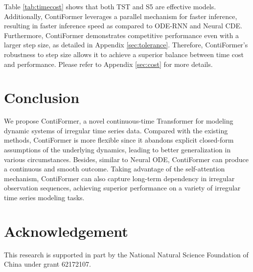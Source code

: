 \documentclass{article}
\begin{document}
Table \ref{tab:timecost} shows that both TST and S5 are effective models. Additionally, ContiFormer leverages a parallel mechanism for faster inference, resulting in faster inference speed as compared to ODE-RNN and Neural CDE. Furthermore, ContiFormer demonstrates competitive performance even with a larger step size, as detailed in Appendix \ref{sec:tolerance}. Therefore, ContiFormer's robustness to step size allows it to achieve a superior balance between time cost and performance. Please refer to Appendix \ref{sec:cost} for more details.

\section{Conclusion}

We propose ContiFormer, a novel continuous-time Transformer for modeling dynamic systems of irregular time series data. Compared with the existing methods, ContiFormer is more flexible since it abandons explicit closed-form assumptions of the underlying dynamics,
leading to
better generalization in various circumstances. 
Besides, similar to Neural ODE, ContiFormer can produce a continuous and smooth outcome. 
Taking advantage of the self-attention mechanism, ContiFormer can also capture long-term dependency in irregular observation sequences, 
achieving superior performance
on a variety of irregular time series modeling tasks.

\section{Acknowledgement}
This research is supported in part by the National Natural Science Foundation of China under grant 62172107.




\newpage

\appendix

\end{document}
